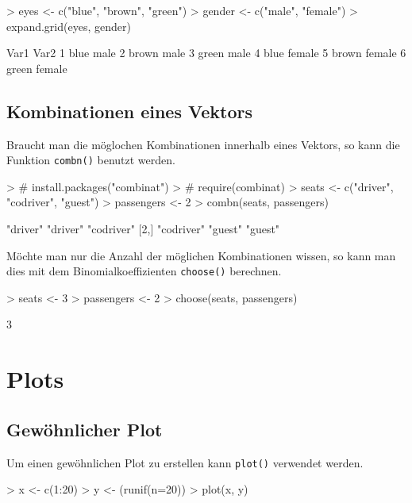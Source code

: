 \begin{Schunk}
\begin{Sinput}
> eyes <- c("blue", "brown", "green")
> gender <- c("male", "female")
> expand.grid(eyes, gender)
\end{Sinput}
\begin{Soutput}
   Var1   Var2
1  blue   male
2 brown   male
3 green   male
4  blue female
5 brown female
6 green female
\end{Soutput}
\end{Schunk}

\subsection{Kombinationen eines Vektors}
Braucht man die möglochen Kombinationen innerhalb eines
Vektors, so kann die Funktion \lstinline{combn()} benutzt
werden.
\begin{Schunk}
\begin{Sinput}
> # install.packages("combinat")
> # require(combinat)
> seats <- c("driver", "codriver", "guest")
> passengers <- 2
> combn(seats, passengers)
\end{Sinput}
\begin{Soutput}
     [,1]       [,2]     [,3]      
[1,] "driver"   "driver" "codriver"
[2,] "codriver" "guest"  "guest"   
\end{Soutput}
\end{Schunk}
Möchte man nur die Anzahl der möglichen Kombinationen
wissen, so kann man dies mit dem Binomialkoeffizienten
\lstinline{choose()} berechnen.
\begin{Schunk}
\begin{Sinput}
> seats <- 3
> passengers <- 2
> choose(seats, passengers)
\end{Sinput}
\begin{Soutput}
[1] 3
\end{Soutput}
\end{Schunk}

\section{Plots}\label{sec:plots}

\subsection{Gewöhnlicher Plot}
Um einen gewöhnlichen Plot zu erstellen kann \lstinline{plot()}
verwendet werden. 

\begin{Schunk}
\begin{Sinput}
> x <- c(1:20)
> y <- (runif(n=20))
> plot(x, y)
\end{Sinput}
\end{Schunk}

